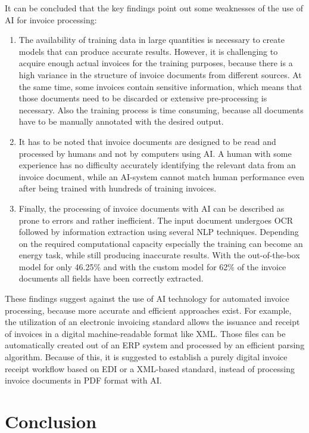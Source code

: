 It can be concluded that the key findings point out some weaknesses of the use of \acl{AI} for invoice processing:
\begin{enumerate}
    \item The availability of training data in large quantities is necessary to create models that can produce accurate results. However, it is challenging to acquire enough actual invoices for the training purposes, because there is a high variance in the structure of invoice documents from different sources. At the same time, some invoices contain sensitive information, which means that those documents need to be discarded or extensive pre-processing is necessary. Also the training process is time consuming, because all documents have to be manually annotated with the desired output.
    \item It has to be noted that invoice documents are designed to be read and processed by humans and not by computers using \ac{AI}. A human with some experience has no difficulty accurately identifying the relevant data from an invoice document, while an \ac{AI}-system cannot match human performance even after being trained with hundreds of training invoices.
    \item Finally, the processing of invoice documents with \ac{AI} can be described as prone to errors and rather inefficient. The input document undergoes \ac{OCR} followed by information extraction using several \ac{NLP} techniques. Depending on the required computational capacity especially the training can become an energy task, while still producing inaccurate results. With the out-of-the-box model for only 46.25\% and with the custom model for 62\% of the invoice documents all fields have been correctly extracted.
\end{enumerate}
These findings suggest against the use of \ac{AI} technology for automated invoice processing, because more accurate and efficient approaches exist. For example, the utilization of an electronic invoicing standard allows the issuance and receipt of invoices in a digital machine-readable format like XML. Those files can be automatically created out of an \ac{ERP} system and processed by an efficient parsing algorithm.
Because of this, it is suggested to establish a purely digital invoice receipt workflow based on \ac{EDI} or a XML-based standard, instead of processing invoice documents in PDF format with \ac{AI}.

\chapter{Conclusion}

